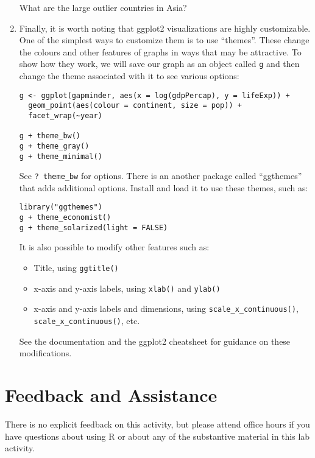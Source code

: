 \documentclass[a4paper,12pt]{article}
\begin{document}
\begin{enumerate}
What are the large outlier countries in Asia?

\item Finally, it is worth noting that ggplot2 visualizations are highly customizable. One of the simplest ways to customize them is to use ``themes''. These change the colours and other features of graphs in ways that may be attractive. To show how they work, we will save our graph as an object called \texttt{g} and then change the theme associated with it to see various options:

\begin{verbatim}
g <- ggplot(gapminder, aes(x = log(gdpPercap), y = lifeExp)) + 
  geom_point(aes(colour = continent, size = pop)) + 
  facet_wrap(~year)

g + theme_bw()
g + theme_gray()
g + theme_minimal()
\end{verbatim}

See \texttt{? theme\_bw} for options. There is an another package called ``ggthemes'' that adds additional options. Install and load it to use these themes, such as:

\begin{verbatim}
library("ggthemes")
g + theme_economist()
g + theme_solarized(light = FALSE)
\end{verbatim}

It is also possible to modify other features such as:

\begin{itemize}
\item Title, using \texttt{ggtitle()}
\item x-axis and y-axis labels, using \texttt{xlab()} and \texttt{ylab()}
\item x-axis and y-axis labels and dimensions, using \texttt{scale\_x\_continuous()}, \texttt{scale\_x\_continuous()}, etc.
\end{itemize}

See the documentation and the ggplot2 cheatsheet for guidance on these modifications.

\end{enumerate}

\section{Feedback and Assistance}

There is no explicit feedback on this activity, but please attend office hours if you have questions about using R or about any of the substantive material in this lab activity.
\end{document}
